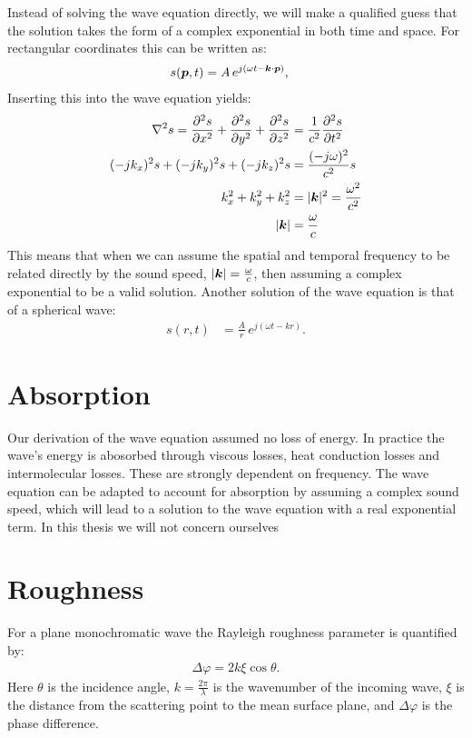 Instead of solving the wave equation directly, we will make a qualified guess that the solution takes the form of a complex exponential in both time and space. For rectangular coordinates this can be written as:
%
\begin{align}
s(\boldsymbol{p},t) &= A\,e^{j(\omega t - \boldsymbol{k}\cdot\boldsymbol{p})},
\end{align}
%
Inserting this into the wave equation yields:
%
\begin{align}
\nabla^2 s = \frac{\partial^2 s}{\partial x^2} + \frac{\partial^2 s}{\partial y^2} + \frac{\partial^2 s}{\partial z^2} &= \frac{1}{c^2}\frac{\partial^2 s}{\partial t^2} \nonumber\\
(-jk_x)^2 s + (-jk_y)^2 s + (-jk_z)^2 s &= \frac{(-j\omega)^2}{c^2} s \nonumber\\
k_x^2 + k_y^2 + k_z^2 &= |\boldsymbol{k}|^2 = \frac{\omega^2}{c^2} \\
|\boldsymbol{k}| &= \frac{\omega}{c}
\end{align}
%
This means that when we can assume the spatial and temporal frequency to be related directly by the sound speed, $|\boldsymbol{k}| = \frac{\omega}{c}$, then assuming a complex exponential to be a valid solution. Another solution of the wave equation is that of a spherical wave:
%
\begin{align}
s(r,t) &= \frac{A}{r}\,e^{j(\omega t - kr)}.
\end{align}

\section{Absorption}

Our derivation of the wave equation assumed no loss of energy. In practice the wave's energy is abosorbed through viscous losses, heat conduction losses and intermolecular losses. These are strongly dependent on frequency. The wave equation can be adapted to account for absorption by assuming a complex sound speed, which will lead to a solution to the wave equation with a real exponential term. In this thesis we will not concern ourselves 

\newpage
\section{Roughness}

For a plane monochromatic wave the Rayleigh roughness parameter is quantified by:
\begin{align}
\Delta\varphi = 2k\xi\cos\theta.
\end{align}
Here $\theta$ is the incidence angle, $k = \frac{2\pi}{\lambda}$ is the wavenumber of the incoming wave, $\xi$ is the distance from the scattering point to the mean surface plane, and $\Delta\varphi$ is the phase difference.

